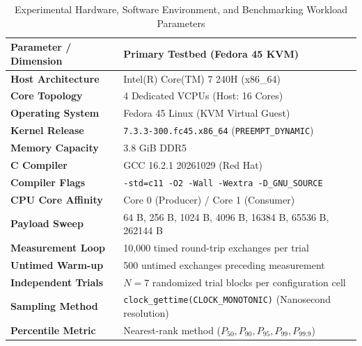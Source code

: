\begin{table}[!t]
\centering
\caption{Experimental Hardware, Software Environment, and Benchmarking Workload Parameters}
\label{tab:environment}
\scriptsize
\renewcommand{\arraystretch}{0.84}
\begin{tabular*}{\columnwidth}{@{\extracolsep{\fill}}lp{4.7cm}}
\toprule
\textbf{Parameter / Dimension} & \textbf{Primary Testbed (Fedora 45 KVM)} \\
\midrule
\textbf{Host Architecture} & Intel(R) Core(TM) 7 240H (x86\_64) \\
\textbf{Core Topology} & 4 Dedicated VCPUs (Host: 16 Cores) \\
\textbf{Operating System} & Fedora 45 Linux (KVM Virtual Guest) \\
\textbf{Kernel Release} & \texttt{7.3.3-300.fc45.x86\_64} (\texttt{PREEMPT\_DYNAMIC}) \\
\textbf{Memory Capacity} & 3.8 GiB DDR5 \\
\textbf{C Compiler} & GCC 16.2.1 20261029 (Red Hat) \\
\textbf{Compiler Flags} & \texttt{-std=c11 -O2 -Wall -Wextra -D\_GNU\_SOURCE} \\
\textbf{CPU Core Affinity} & Core 0 (Producer) / Core 1 (Consumer) \\
\midrule
\textbf{Payload Sweep} & 64 B, 256 B, 1024 B, 4096 B, 16384 B, 65536 B, 262144 B \\
\textbf{Measurement Loop} & 10,000 timed round-trip exchanges per trial \\
\textbf{Untimed Warm-up} & 500 untimed exchanges preceding measurement \\
\textbf{Independent Trials} & $N = 7$ randomized trial blocks per configuration cell \\
\textbf{Sampling Method} & \texttt{clock\_gettime(CLOCK\_MONOTONIC)} (Nanosecond resolution) \\
\textbf{Percentile Metric} & Nearest-rank method ($P_{50}, P_{90}, P_{95}, P_{99}, P_{99.9}$) \\
\bottomrule
\end{tabular*}
\end{table}
